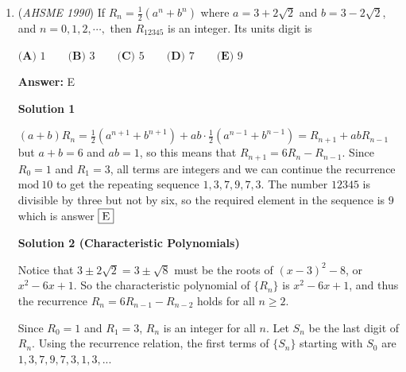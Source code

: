\begin{enumerate}
 \[\begin{array}{ccccc}1&3&9&27&81\\2&6&18&54\\4&12&36\\5&15&45\\7&21&63\\8&24&72\\10&30&90\\11&33&99\\13&39\\\vdots&\vdots\end{array}\]We can take at most $3$ elements from the first row, and at most $2$ elements from each of the next seven rows. After that we can take only $1$ from any following row. Thus the answer is $3+7\cdot 2\,+$ the number of integers between $13$ and $100$ inclusive which are indivisible by three.

 There are $\frac13(99-12)=29$ multiples of three in that range, so there are $88-29=59$ non-multiples, and $3+14+59=76$, which is $\fbox{D}$



	\item (\textit{AHSME 1990}) If $R_n=\frac{1}{2}(a^n+b^n)$  where $a=3+2\sqrt{2}$ and $b=3-2\sqrt{2}$, and $n=0,1,2,\cdots,$ then $R_{12345}$ is an integer.  Its units digit is


 $\textbf{(A) } 1\qquad \textbf{(B) } 3\qquad \textbf{(C) } 5\qquad \textbf{(D) } 7\qquad \textbf{(E) } 9$

 \textbf{Answer: }E



\textbf{Solution 1}

$(a+b)R_n=\frac12(a^{n+1}+b^{n+1})+ab\cdot\frac12(a^{n-1}+b^{n-1})=R_{n+1}+abR_{n-1}$but $a+b=6$ and $ab=1$, so this means that $R_{n+1}=6R_n-R_{n-1}$. Since $R_0=1$ and $R_1=3$, all terms are integers and we can continue the recurrence $\textrm{mod}\ 10$ to get the repeating sequence $1,3,7,9,7,3$. The number $12345$ is divisible by three but not by six, so the required element in the sequence is $9$ which is answer $\fbox{E}$




\textbf{Solution 2 (Characteristic Polynomials)}

Notice that $3 \pm 2\sqrt{2} = 3 \pm \sqrt{8}$ must be the roots of $(x - 3)^2 - 8$, or $x^2 - 6x + 1$.  So the characteristic polynomial of $\{R_n\}$ is $x^2 - 6x + 1$, and thus the recurrence $R_n = 6R_{n-1} - R_{n-2}$ holds for all $n \geq 2$.

 Since $R_0 = 1$ and $R_1 = 3$, $R_n$ is an integer for all $n$.  Let $S_n$ be the last digit of $R_n$.  Using the recurrence relation, the first terms of $\{S_n\}$ starting with $S_0$ are $1, 3, 7, 9, 7, 3, 1, 3, ...$ 


\end{enumerate}
